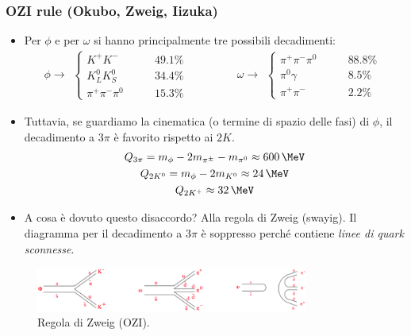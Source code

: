 \subsubsection{OZI rule (Okubo, Zweig, Iizuka)}
\begin{itemize}
\item Per $\phi$ e per $\omega$ si hanno principalmente tre possibili decadimenti:
\begin{equation*}
\phi\to
    \begin{aligned}
        \begin{cases}
            K^+K^-\qquad &49.1\%\\
            K^0_L K^0_S\qquad &34.4\%\\
            \pi^+\pi^-\pi^0\qquad &15.3\%
        \end{cases}
    \end{aligned}
\qquad\qquad
\omega\to
    \begin{aligned}
        \begin{cases}
            \pi^+\pi^-\pi^0\qquad &88.8\%\\
            \pi^0\gamma\qquad &8.5\%\\
            \pi^+\pi^-\qquad &2.2\%
        \end{cases}
    \end{aligned}
\end{equation*} 
\item Tuttavia, se guardiamo la cinematica (o termine di spazio delle fasi) di $\phi$, il decadimento a $3\pi$ è favorito rispetto ai $2K$.
\begin{gather*}
Q_{3\pi}=m_\phi-2m_{\pi^\pm}-m_{\pi^0}\approx600\,\MeV\\
Q_{2K^0}=m_\phi-2m_{K^0}\approx24\,\MeV\\
Q_{2K^+}\approx32\,\MeV
\end{gather*}
\item A cosa è dovuto questo disaccordo? Alla regola di Zweig (swayig). Il diagramma per il decadimento a $3\pi$ è soppresso perché contiene \textit{linee di quark sconnesse}.
\end{itemize}
\begin{figure}[H]
    \centering
    \includegraphics[width=0.8\textwidth]{immagini/fig_ozi_rule.png}
    \caption{Regola di Zweig (OZI).}
  \end{figure}

